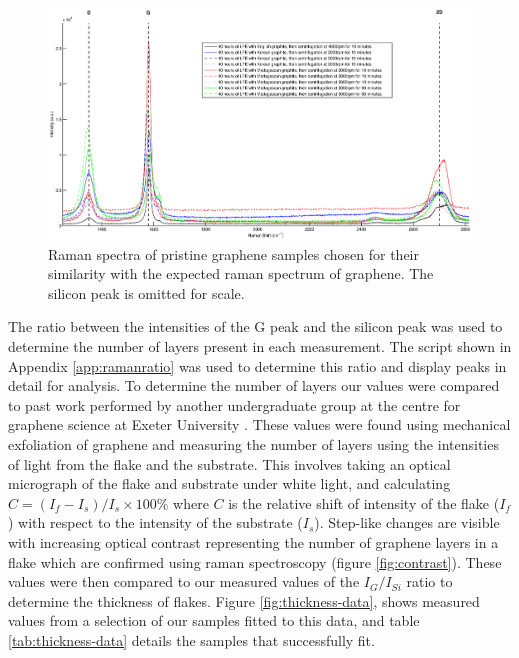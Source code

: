 \documentclass[12pt,titlepage]{article}
\begin{document}
	\begin{figure}
		\centering
		\includegraphics[width=1\textwidth]{figures/pristine.eps}
		\caption[Pristine graphene raman spectra.]{Raman spectra of pristine graphene samples chosen for their similarity with the expected raman spectrum of graphene. The silicon peak is omitted for scale.}
		\label{fig:pristine-raman}
	\end{figure}
	
	The ratio between the intensities of the G peak and the silicon peak was used to determine the number of layers present in each measurement. The script shown in Appendix \ref{app:ramanratio} was used to determine this ratio and display peaks in detail for analysis. To determine the number of layers our values were compared to past work performed by another undergraduate group at the centre for graphene science at Exeter University \cite{WillMoo}. These values were found using mechanical exfoliation of graphene and measuring the number of layers using the intensities of light from the flake and the substrate. This involves taking an optical micrograph of the flake and substrate under white light, and calculating $C = (I_f-I_s)/I_s\times100\%$ where $C$ is the relative shift of intensity of the flake ($I_f$) with respect to the intensity of the substrate ($I_s$). Step-like changes are visible with increasing optical contrast representing the number of graphene layers in a flake which are confirmed using raman spectroscopy (figure \ref{fig:contrast})\cite{Khrapach2012a}. These values were then compared to our measured values of the $I_G/I_{Si}$ ratio to determine the thickness of flakes. Figure \ref{fig:thickness-data}, shows measured values from a selection of our samples fitted to this data, and table \ref{tab:thickness-data} details the samples that successfully fit.
	
\end{document}

